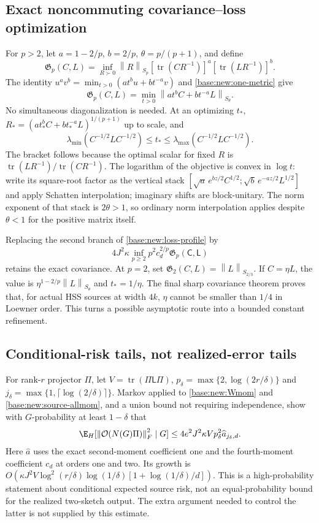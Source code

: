 \documentclass[11pt,oneside,openany,a4paper]{book}
\numberwithin{equation}{chapter}
\theoremstyle{definition}
\theoremstyle{remark}
\newcommand{\F}[1]{\left\lVert#1\right\rVert_F}
\DeclareMathOperator{\tr}{tr}\DeclareMathOperator{\rank}{rank}
\newcommand{\Sn}[2]{\left\lVert#1\right\rVert_{S_{#2}}}
\newcommand{\Cov}{\mathsf C}\newcommand{\Loss}{\mathsf L}\newcommand{\Fil}{\mathcal F}
\begin{document}
\subsection{Exact noncommuting covariance--loss optimization}
For $p>2$, let $a=1-2/p$, $b=2/p$, $\theta=p/(p+1)$, and define
\[
 \mathfrak G_p(C,L)=\inf_{R\succ0}\Sn Rp
 [\tr(CR^{-1})]^a[\tr(LR^{-1})]^b.
\]
The identity $u^av^b=\min_{t>0}(at^bu+bt^{-a}v)$ and \eqref{base:new:one-metric} give
\begin{equation}\label{base:new:mixed-metric}
 \boxed{\mathfrak G_p(C,L)=\min_{t>0}\Sn{at^bC+bt^{-a}L}{\theta}.}
\end{equation}
No simultaneous diagonalization is needed. At an optimizing $t_*$,
$R_*=(at_*^bC+bt_*^{-a}L)^{1/(p+1)}$ up to scale, and
\[
 \lambda_{\min}(C^{-1/2}LC^{-1/2})\le t_*\le
 \lambda_{\max}(C^{-1/2}LC^{-1/2}).
\]
The bracket follows because the optimal scalar for fixed $R$ is
$\tr(LR^{-1})/\tr(CR^{-1})$. The logarithm of the objective is convex in $\log t$: write its square-root factor as the vertical stack
$[\sqrt a\,e^{bz/2}C^{1/2};\sqrt b\,e^{-az/2}L^{1/2}]$ and apply Schatten interpolation; imaginary shifts are block-unitary. The norm exponent of that stack is $2\theta>1$, so ordinary norm interpolation applies despite $\theta<1$ for the positive matrix itself.

Replacing the second branch of \eqref{base:new:loss-profile} by
\[
 4J^2\kappa\inf_{p\ge2}p^2c_d^{2/p}\mathfrak G_p(\Cov,\Loss)
\]
retains the exact covariance. At $p=2$, set $\mathfrak G_2(C,L)=\Sn L{2/3}$. If $C=\eta L$, the value is $\eta^{1-2/p}\Sn L\theta$ and $t_*=1/\eta$. The final sharp covariance theorem proves that, for actual HSS sources at width $4k$, $\eta$ cannot be smaller than $1/4$ in Loewner order. This turns a possible asymptotic route into a bounded constant refinement.

\subsection{Conditional-risk tails, not realized-error tails}
For rank-$r$ projector $\Pi$, let $V=\tr(\Pi\Loss\Pi)$,
$p_\delta=\max\{2,\log(2r/\delta)\}$ and
$j_\delta=\max\{1,\lceil\log(2/\delta)\rceil\}$. Markov applied to \eqref{base:new:Wmom} and \eqref{base:new:source-allmom}, and a union bound not requiring independence, show with $G$-probability at least $1-\delta$ that
\begin{equation}\label{base:new:cond-risk}
 \E_H[\F{\mathcal O(N(G)\Pi)}^2\mid G]
 \le4e^2J^2\kappa Vp_\delta^2\widehat a_{j_\delta,d}.
\end{equation}
Here $\widehat a$ uses the exact second-moment coefficient one and the fourth-moment coefficient $c_d$ at orders one and two. Its growth is
$O(\kappa J^2V\log^2(r/\delta)\log(1/\delta)[1+\log(1/\delta)/d])$.
This is a high-probability statement about conditional expected source risk, not an equal-probability bound for the realized two-sketch output. The extra argument needed to control the latter is not supplied by this estimate.
\end{document}
